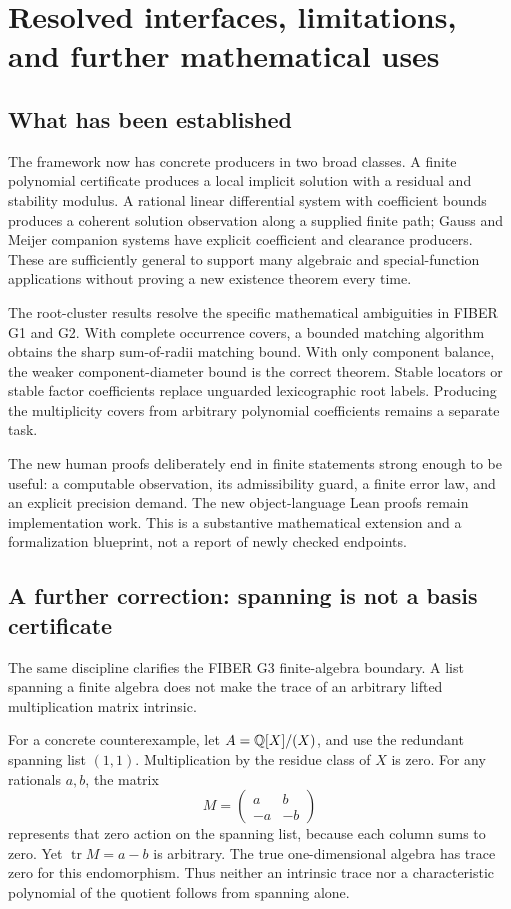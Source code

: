 \section{Resolved interfaces, limitations, and further mathematical uses}\label{sec:boundaries}

\subsection{What has been established}

The framework now has concrete producers in two broad classes. A finite polynomial certificate produces a local implicit solution with a residual and stability modulus. A rational linear differential system with coefficient bounds produces a coherent solution observation along a supplied finite path; Gauss and Meijer companion systems have explicit coefficient and clearance producers. These are sufficiently general to support many algebraic and special-function applications without proving a new existence theorem every time.

The root-cluster results resolve the specific mathematical ambiguities in FIBER G1 and G2. With complete occurrence covers, a bounded matching algorithm obtains the sharp sum-of-radii matching bound. With only component balance, the weaker component-diameter bound is the correct theorem. Stable locators or stable factor coefficients replace unguarded lexicographic root labels. Producing the multiplicity covers from arbitrary polynomial coefficients remains a separate task.

The new human proofs deliberately end in finite statements strong enough to be useful: a computable observation, its admissibility guard, a finite error law, and an explicit precision demand. The new object-language Lean proofs remain implementation work. This is a substantive mathematical extension and a formalization blueprint, not a report of newly checked endpoints.

\subsection{A further correction: spanning is not a basis certificate}

The same discipline clarifies the FIBER G3 finite-algebra boundary. A list spanning a finite algebra does not make the trace of an arbitrary lifted multiplication matrix intrinsic.

For a concrete counterexample, let \(A=\mathbb Q[X]/(X)\), and use the redundant spanning list \((1,1)\). Multiplication by the residue class of \(X\) is zero. For any rationals \(a,b\), the matrix
\[
 M=\begin{pmatrix}a&b\\-a&-b\end{pmatrix}
\]
represents that zero action on the spanning list, because each column sums to zero. Yet \(\operatorname{tr}M=a-b\) is arbitrary. The true one-dimensional algebra has trace zero for this endomorphism. Thus neither an intrinsic trace nor a characteristic polynomial of the quotient follows from spanning alone.


